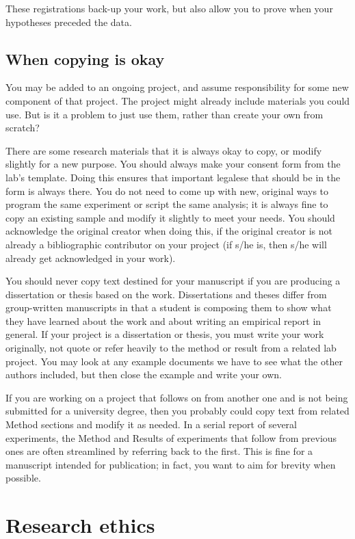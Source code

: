 \documentclass[
  12pt,
]{book}
\begin{document}
These registrations back-up your work, but also allow you to prove when your hypotheses preceded the data.

\section{When copying is okay}\label{when-copying-is-okay}

You may be added to an ongoing project, and assume responsibility for some new component of that project. The project might already include materials you could use. But is it a problem to just use them, rather than create your own from scratch?

There are some research materials that it is always okay to copy, or modify slightly for a new purpose. You should always make your consent form from the lab's template. Doing this ensures that important legalese that should be in the form is always there. You do not need to come up with new, original ways to program the same experiment or script the same analysis; it is always fine to copy an existing sample and modify it slightly to meet your needs. You should acknowledge the original creator when doing this, if the original creator is not already a bibliographic contributor on your project (if s/he is, then s/he will already get acknowledged in your work).

You should never copy text destined for your manuscript if you are producing a dissertation or thesis based on the work. Dissertations and theses differ from group-written manuscripts in that a student is composing them to show what they have learned about the work and about writing an empirical report in general. If your project is a dissertation or thesis, you must write your work originally, not quote or refer heavily to the method or result from a related lab project. You may look at any example documents we have to see what the other authors included, but then close the example and write your own.

If you are working on a project that follows on from another one and is not being submitted for a university degree, then you probably could copy text from related Method sections and modify it as needed. In a serial report of several experiments, the Method and Results of experiments that follow from previous ones are often streamlined by referring back to the first. This is fine for a manuscript intended for publication; in fact, you want to aim for brevity when possible.

\chapter{Research ethics}\label{research-ethics}
\end{document}
